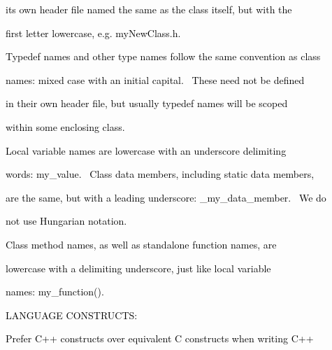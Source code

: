 \documentclass[a4paper]{article}
\newcommand\textstyleOOoComputerKeyWord[1]{\textrm{\textcolor[rgb]{0.0,0.0,0.5019608}{#1}}}
\begin{document}
{\color{black}
\textstyleOOoComputerKeyWord{\textcolor{black}{its own header file named the same as the class itself, but with the}}}

{\color{black}
\textstyleOOoComputerKeyWord{\textcolor{black}{first letter lowercase, e.g. myNewClass.h.}}}


\bigskip

{\color{black}
\textstyleOOoComputerKeyWord{\textcolor{black}{Typedef names and other type names follow the same convention as class}}}

{\color{black}
\textstyleOOoComputerKeyWord{\textcolor{black}{names: mixed case with an initial capital. \ These need not be defined}}}

{\color{black}
\textstyleOOoComputerKeyWord{\textcolor{black}{in their own header file, but usually typedef names will be scoped}}}

{\color{black}
\textstyleOOoComputerKeyWord{\textcolor{black}{within some enclosing class.}}}


\bigskip

{\color{black}
\textstyleOOoComputerKeyWord{\textcolor{black}{Local variable names are lowercase with an underscore delimiting}}}

{\color{black}
\textstyleOOoComputerKeyWord{\textcolor{black}{words: my\_value. \ Class data members, including static data members,}}}

{\color{black}
\textstyleOOoComputerKeyWord{\textcolor{black}{are the same, but with a leading underscore: \_my\_data\_member. \ We
do}}}

{\color{black}
\textstyleOOoComputerKeyWord{\textcolor{black}{not use Hungarian notation.}}}


\bigskip

{\color{black}
\textstyleOOoComputerKeyWord{\textcolor{black}{Class method names, as well as standalone function names, are}}}

{\color{black}
\textstyleOOoComputerKeyWord{\textcolor{black}{lowercase with a delimiting underscore, just like local variable}}}

{\color{black}
\textstyleOOoComputerKeyWord{\textcolor{black}{names: my\_function().}}}


\bigskip


\bigskip

{\color{black}
\textstyleOOoComputerKeyWord{\textcolor{black}{LANGUAGE CONSTRUCTS:}}}


\bigskip

{\color{black}
\textstyleOOoComputerKeyWord{\textcolor{black}{Prefer C++ constructs over equivalent C constructs when writing C++}}}
\end{document}
